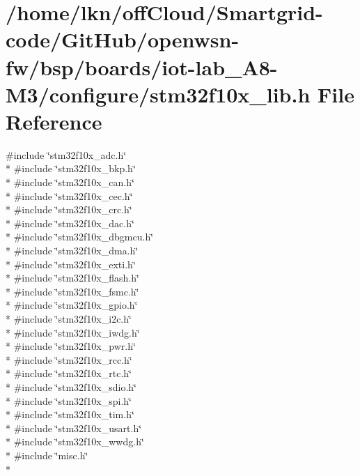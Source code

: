 \hypertarget{iot-lab___a8-_m3_2configure_2stm32f10x__lib_8h}{}\section{/home/lkn/off\+Cloud/\+Smartgrid-\/code/\+Git\+Hub/openwsn-\/fw/bsp/boards/iot-\/lab\+\_\+\+A8-\/\+M3/configure/stm32f10x\+\_\+lib.h File Reference}
\label{iot-lab___a8-_m3_2configure_2stm32f10x__lib_8h}
{\ttfamily \#include \char`\"{}stm32f10x\+\_\+adc.\+h\char`\"{}}\\*
{\ttfamily \#include \char`\"{}stm32f10x\+\_\+bkp.\+h\char`\"{}}\\*
{\ttfamily \#include \char`\"{}stm32f10x\+\_\+can.\+h\char`\"{}}\\*
{\ttfamily \#include \char`\"{}stm32f10x\+\_\+cec.\+h\char`\"{}}\\*
{\ttfamily \#include \char`\"{}stm32f10x\+\_\+crc.\+h\char`\"{}}\\*
{\ttfamily \#include \char`\"{}stm32f10x\+\_\+dac.\+h\char`\"{}}\\*
{\ttfamily \#include \char`\"{}stm32f10x\+\_\+dbgmcu.\+h\char`\"{}}\\*
{\ttfamily \#include \char`\"{}stm32f10x\+\_\+dma.\+h\char`\"{}}\\*
{\ttfamily \#include \char`\"{}stm32f10x\+\_\+exti.\+h\char`\"{}}\\*
{\ttfamily \#include \char`\"{}stm32f10x\+\_\+flash.\+h\char`\"{}}\\*
{\ttfamily \#include \char`\"{}stm32f10x\+\_\+fsmc.\+h\char`\"{}}\\*
{\ttfamily \#include \char`\"{}stm32f10x\+\_\+gpio.\+h\char`\"{}}\\*
{\ttfamily \#include \char`\"{}stm32f10x\+\_\+i2c.\+h\char`\"{}}\\*
{\ttfamily \#include \char`\"{}stm32f10x\+\_\+iwdg.\+h\char`\"{}}\\*
{\ttfamily \#include \char`\"{}stm32f10x\+\_\+pwr.\+h\char`\"{}}\\*
{\ttfamily \#include \char`\"{}stm32f10x\+\_\+rcc.\+h\char`\"{}}\\*
{\ttfamily \#include \char`\"{}stm32f10x\+\_\+rtc.\+h\char`\"{}}\\*
{\ttfamily \#include \char`\"{}stm32f10x\+\_\+sdio.\+h\char`\"{}}\\*
{\ttfamily \#include \char`\"{}stm32f10x\+\_\+spi.\+h\char`\"{}}\\*
{\ttfamily \#include \char`\"{}stm32f10x\+\_\+tim.\+h\char`\"{}}\\*
{\ttfamily \#include \char`\"{}stm32f10x\+\_\+usart.\+h\char`\"{}}\\*
{\ttfamily \#include \char`\"{}stm32f10x\+\_\+wwdg.\+h\char`\"{}}\\*
{\ttfamily \#include \char`\"{}misc.\+h\char`\"{}}\\*
